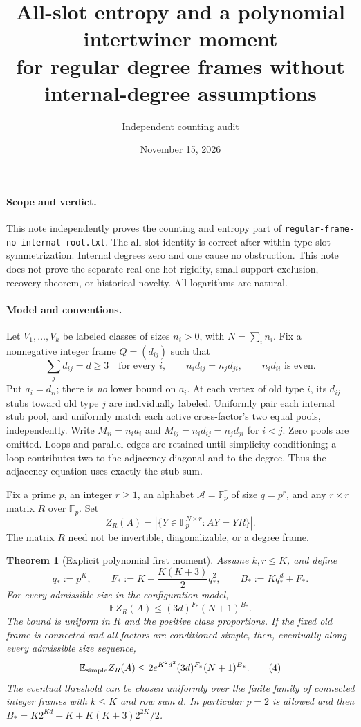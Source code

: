 \documentclass[11pt]{article}
\title{All-slot entropy and a polynomial intertwiner moment\\for regular degree frames without internal-degree assumptions}
\author{Independent counting audit}
\date{November 15, 2026}
\newtheorem{theorem}{Theorem}
\newcommand{\E}{\mathbb E}
\newcommand{\F}{\mathbb F}
\begin{document}
\maketitle

\paragraph{Scope and verdict.}
This note independently proves the counting and entropy part of
\texttt{regular-frame-no-internal-root.txt}. The all-slot identity is
correct after within-type slot symmetrization. Internal degrees zero and
one cause no obstruction. This note does not prove the separate real
one-hot rigidity, small-support exclusion, recovery theorem, or historical
novelty. All logarithms are natural.

\paragraph{Model and conventions.}
Let $V_1,\ldots,V_k$ be labeled classes of sizes $n_i>0$, with
$N=\sum_i n_i$. Fix a nonnegative integer frame $Q=(d_{ij})$ such that
\[
 \sum_jd_{ij}=d\geq3\quad\text{for every }i,\qquad
 n_i d_{ij}=n_jd_{ji},\qquad n_i d_{ii}\text{ is even}.
 \tag{1}
\]
Put $a_i=d_{ii}$; there is \emph{no} lower bound on $a_i$.
At each vertex of old type $i$, its $d_{ij}$ stubs toward old type $j$
are individually labeled. Uniformly pair each internal stub pool, and
uniformly match each active cross-factor's two equal pools, independently.
Write $M_{ii}=n_i a_i$ and $M_{ij}=n_i d_{ij}=n_jd_{ji}$ for $i<j$.
Zero pools are omitted. Loops and parallel edges are retained until
simplicity conditioning; a loop contributes two to the adjacency diagonal
and to the degree. Thus the adjacency equation uses exactly the stub sum.

Fix a prime $p$, an integer $r\geq1$, an alphabet $\mathcal A=\F_p^r$
of size $q=p^r$, and any $r\times r$ matrix $R$ over $\F_p$. Set
\[
 Z_R(A)=|\{Y\in\F_p^{N\times r}:AY=YR\}|.
\]
The matrix $R$ need not be invertible, diagonalizable, or a degree frame.

\begin{theorem}[Explicit polynomial first moment]
Assume $k,r\leq K$, and define
\[
 q_*:=p^K,\qquad
 F_*:=K+\frac{K(K+3)}2q_*^2,\qquad
 B_*:=Kq_*^d+F_*.
 \tag{2}
\]
For every admissible size in the configuration model,
\[
 \E Z_R(A)\leq(3d)^{F_*}(N+1)^{B_*}.                 \tag{3}
\]
The bound is uniform in $R$ and the positive class proportions. If the
fixed old frame is connected and all factors are conditioned simple,
then, eventually along every admissible size sequence,
\[
 \E_{\rm simple} Z_R(A)\leq
 2e^{K^2d^2}(3d)^{F_*}(N+1)^{B_*}.                 \tag{4}
\]
The eventual threshold can be chosen uniformly over the finite family of
connected integer frames with $k\leq K$ and row sum $d$. In particular
$p=2$ is allowed and then $B_*=K2^{Kd}+K+K(K+3)2^{2K}/2$.
\end{theorem}
\end{document}
